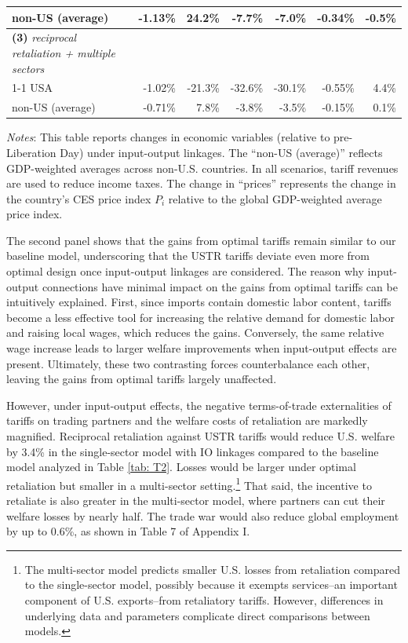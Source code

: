 \documentclass[12pt]{article}
\begin{document}
\begin{table}[htbp]
{\begin{tabular}{lrrrrrr}
non-US (average) & -1.13\%  & 24.2\% & -7.7\% & -7.0\% & -0.34\% & -0.5\% \\ \midrule
\addlinespace[5pt]
\textbf{(3)}  \textit{reciprocal retaliation + multiple sectors}  \\
\cmidrule(lr){1-1}
USA & -1.02\% & -21.3\% & -32.6\% &-30.1\% & -0.55\% & 4.4\% \\  \addlinespace[3pt]
non-US (average) & -0.71\%  & 7.8\% & -3.8\% & -3.5\% & -0.15\% & 0.1\% \\  \bottomrule
\end{tabular}}
\vspace{-10pt}
\begin{flushleft}
\footnotesize{\textit{Notes}: This table reports changes in economic variables (relative to pre-Liberation Day) under input-output linkages. The ``non-US (average)'' reflects GDP-weighted averages across non-U.S. countries. In all scenarios, tariff revenues are used to reduce income taxes. The change in ``prices'' represents the change in the country's CES price index $P_i$ relative to the global GDP-weighted average price index.}
\end{flushleft}
\end{table}

The second panel shows that the gains from optimal tariffs remain similar to our baseline model, underscoring that the USTR tariffs deviate even more from optimal design once input-output linkages are considered. The reason why input-output connections have minimal impact on the gains from optimal tariffs can be intuitively explained. First, since imports contain domestic labor content, tariffs become a less effective tool for increasing the relative demand for domestic labor and raising local wages, which reduces the gains. Conversely, the same relative wage increase leads to larger welfare improvements when input-output effects are present. Ultimately, these two contrasting forces counterbalance each other, leaving the gains from optimal tariffs largely unaffected.

However, under input-output effects, the negative terms-of-trade externalities of tariffs on trading partners and the welfare costs of retaliation are markedly magnified. Reciprocal retaliation against USTR tariffs would reduce U.S. welfare by 3.4\% in the single-sector model with IO linkages compared to the baseline model analyzed in Table \ref{tab: T2}. Losses would be larger under optimal retaliation but smaller in a multi-sector setting.\footnote{The multi-sector model predicts smaller U.S. losses from retaliation compared to the single-sector model, possibly because it exempts services--an important component of U.S. exports--from retaliatory tariffs. However, differences in underlying data and parameters complicate direct comparisons between models.} That said, the incentive to retaliate is also greater in the multi-sector model, where partners can cut their welfare losses by nearly half. The trade war would also reduce global employment by up to 0.6\%, as shown in Table 7 of Appendix I.
\end{document}
